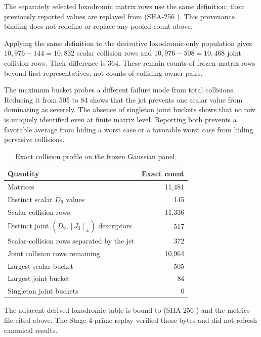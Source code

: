 \documentclass[11pt,a4paper]{article}
\theoremstyle{definition}
\theoremstyle{remark}
\begin{document}
The separately selected loxodromic matrix rows use the same definition; their previously reported values are replayed from  (SHA-256 ). This provenance binding does not redefine or replace any pooled count above.

Applying the same definition to the derivative loxodromic-only population gives \(10{,}976-144=10{,}832\) scalar collision rows and \(10{,}976-508=10{,}468\) joint collision rows. Their difference is \(364\). These remain counts of frozen matrix rows beyond first representatives, not counts of colliding owner pairs.

The maximum bucket probes a different failure mode from total collisions. Reducing it from 505 to 84 shows that the jet prevents one scalar value from dominating as severely. The absence of singleton joint buckets shows that no row is uniquely identified even at finite matrix level. Reporting both prevents a favorable average from hiding a worst case or a favorable worst case from hiding pervasive collisions.

\begin{table}[t]
\centering
\caption{Exact collision profile on the frozen Gaussian panel.}
\label{tab:collision}
\begin{tabular}{lr}
\toprule
Quantity & Exact count \\
\midrule
Matrices & 11,481 \\
Distinct scalar \(D_9\) values & 145 \\
Scalar collision rows & 11,336 \\
Distinct joint \((D_9,[J_3]_{\pm})\) descriptors & 517 \\
Scalar-collision rows separated by the jet & 372 \\
Joint collision rows remaining & 10,964 \\
Largest scalar bucket & 505 \\
Largest joint bucket & 84 \\
Singleton joint buckets & 0 \\
\bottomrule
\end{tabular}
\end{table}

The adjacent derived loxodromic table is bound to  (SHA-256 ) and the metrics file cited above. The Stage-4-prime replay verified those bytes and did not refresh canonical results.
\end{document}
